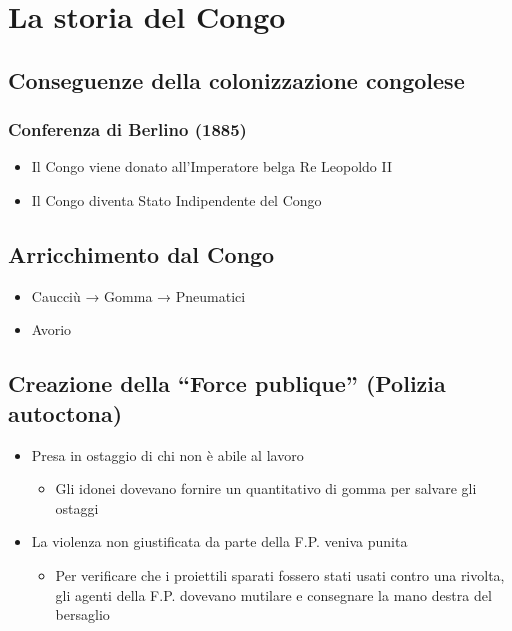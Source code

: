 \documentclass{article}
\begin{document}
\newpage
\section{La storia del Congo}

\subsection{Conseguenze della colonizzazione congolese}

\subsubsection{Conferenza di Berlino (1885)}
\begin{itemize}
    \item Il Congo viene donato all’Imperatore belga Re Leopoldo II
    \item Il Congo diventa Stato Indipendente del Congo
\end{itemize}

\subsection{Arricchimento dal Congo}
\begin{itemize}
    \item Caucciù → Gomma → Pneumatici
    \item Avorio
\end{itemize}

\subsection{Creazione della “Force publique” (Polizia autoctona)}
\begin{itemize}
    \item Presa in ostaggio di chi non è abile al lavoro
    \begin{itemize}
        \item Gli idonei dovevano fornire un quantitativo di gomma per salvare gli ostaggi
    \end{itemize}
    \item La violenza non giustificata da parte della F.P. veniva punita
    \begin{itemize}
        \item Per verificare che i proiettili sparati fossero stati usati contro una rivolta, gli agenti della F.P. dovevano mutilare e consegnare la mano destra del bersaglio
    \end{itemize}
\end{itemize}
\end{document}
